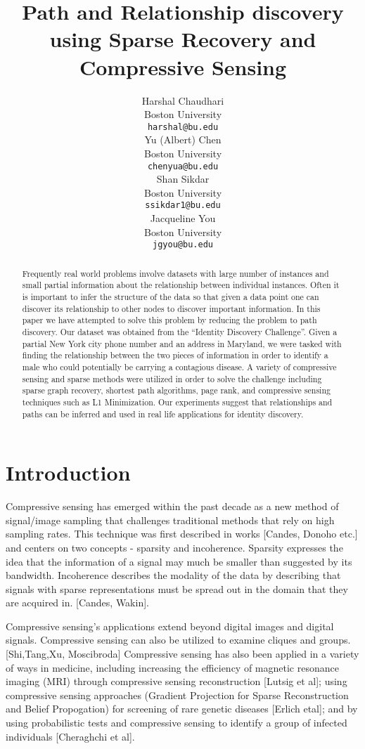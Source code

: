 \documentclass{article} %
\title{Path and Relationship discovery using Sparse Recovery and Compressive Sensing}
\author{
Harshal Chaudhari\\
Boston University \\
\texttt{harshal@bu.edu} \\
\And
Yu (Albert) Chen\\
Boston University \\
\texttt{chenyua@bu.edu} \\
\And
Shan Sikdar\\
Boston University  \\
\texttt{ssikdar1@bu.edu} \\
\And
Jacqueline You\\
Boston University \\
\texttt{jgyou@bu.edu} \\
}
\begin{document}
\maketitle

\begin{abstract}
Frequently real world problems involve datasets with large number of instances and small partial information about the relationship between individual instances. Often it is important to infer the structure of the data so that given a data point one can discover its relationship to other nodes to discover important information. In this paper we have attempted to solve this problem by reducing the problem to path discovery.  Our dataset was obtained from the “Identity Discovery Challenge”. Given a partial New York city phone number and an address in Maryland, we were tasked with finding the relationship between the two pieces of information in order to identify a male who could potentially be carrying a contagious disease.  A variety of compressive sensing and sparse methods were utilized in order to solve the challenge including sparse graph recovery, shortest path algorithms, page rank, and compressive sensing techniques such as L1 Minimization. Our experiments suggest that relationships and paths can be inferred and used in real life applications for identity discovery.
\end{abstract}


\section{Introduction}


Compressive sensing has emerged within the past decade as a new method of signal/image sampling that challenges traditional methods that rely on high sampling rates. This technique was first described in works [Candes, Donoho etc.] and centers on two concepts - sparsity and incoherence.  Sparsity expresses the idea that the information of a signal may much be smaller than suggested by its bandwidth. Incoherence describes the modality of the data by describing that signals with sparse representations must be spread out in the domain that they are acquired in. [Candes, Wakin]. 

Compressive sensing's applications extend beyond digital images and digital signals. Compressive sensing can also be utilized to examine cliques and groups. [Shi,Tang,Xu, Moscibroda] Compressive sensing has also been applied in a variety of ways in medicine, including increasing the efficiency of magnetic resonance imaging (MRI) through compressive sensing reconstruction [Lutsig et al]; using compressive sensing approaches (Gradient Projection for Sparse Reconstruction and Belief Propogation) for screening of rare genetic diseases [Erlich etal]; and by using probabilistic tests and compressive sensing to identify a group of infected individuals [Cheraghchi et al]. 
\end{document}
